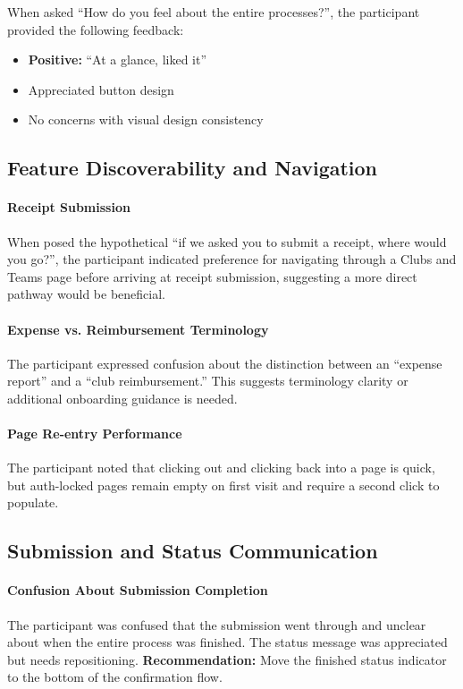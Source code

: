 \documentclass[12pt, titlepage]{article}
\begin{document}
When asked ``How do you feel about the entire processes?'', the participant provided the following feedback:
\begin{itemize}
    \item \textbf{Positive:} ``At a glance, liked it''
    \item Appreciated button design
    \item No concerns with visual design consistency
\end{itemize}

\subsection{Feature Discoverability and Navigation}

\paragraph{Receipt Submission}
When posed the hypothetical ``if we asked you to submit a receipt, where would you go?'', the participant indicated preference for navigating through a Clubs and Teams page before arriving at receipt submission, suggesting a more direct pathway would be beneficial.

\paragraph{Expense vs. Reimbursement Terminology}
The participant expressed confusion about the distinction between an ``expense report'' and a ``club reimbursement.'' This suggests terminology clarity or additional onboarding guidance is needed.

\paragraph{Page Re-entry Performance}
The participant noted that clicking out and clicking back into a page is quick, but auth-locked pages remain empty on first visit and require a second click to populate.

\subsection{Submission and Status Communication}

\paragraph{Confusion About Submission Completion}
The participant was confused that the submission went through and unclear about when the entire process was finished. The status message was appreciated but needs repositioning. \textbf{Recommendation:} Move the finished status indicator to the bottom of the confirmation flow.
\end{document}
